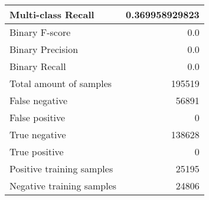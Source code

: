 \begin{table}[H]
\begin{minipage}{0.5\textwidth}
\begin{tabular}{l r}
Multi-class Recall & 0.369958929823 \\
\midrule
Binary F-score & 0.0 \\
Binary Precision & 0.0 \\
Binary Recall & 0.0 \\
\midrule
Total amount of samples & 195519 \\
False negative & 56891 \\
False positive & 0 \\
True negative & 138628 \\
True positive & 0 \\
\midrule
Positive training samples & 25195 \\
Negative training samples & 24806 \\
\bottomrule
\end{tabular}
\end{minipage}
\end{table}

